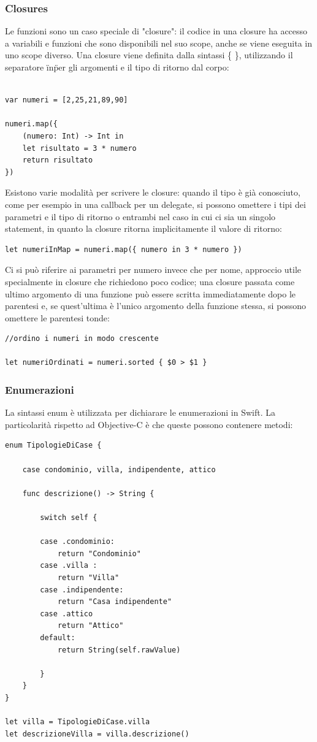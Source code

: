 \subsubsection{Closures}
Le funzioni sono un caso speciale di "closure": il codice in una closure ha accesso a variabili e funzioni che sono disponibili nel suo scope, anche se viene eseguita in uno scope diverso. Una closure viene definita dalla sintassi \{ \}, utilizzando il separatore \"in\" per gli argomenti e il tipo di ritorno dal corpo:\\\\ 
\lstset{language=[Objective]C, breakindent=40pt, breaklines}
\begin{lstlisting}
var numeri = [2,25,21,89,90]

numeri.map({
	(numero: Int) -> Int in 
	let risultato = 3 * numero 
	return risultato 
})
\end{lstlisting}
Esistono varie modalità per scrivere le closure: quando il tipo è già conosciuto, come per esempio in una callback per un delegate, si possono omettere i tipi dei parametri e il tipo di ritorno o entrambi nel caso in cui ci sia un singolo statement, in quanto la closure ritorna implicitamente il valore di ritorno:
\lstset{language=[Objective]C, breakindent=40pt, breaklines}
\begin{lstlisting}
let numeriInMap = numeri.map({ numero in 3 * numero })
\end{lstlisting}
Ci si può riferire ai parametri per numero invece che per nome, approccio utile specialmente in closure che richiedono poco codice; una closure passata come ultimo argomento di una funzione può essere scritta immediatamente dopo le parentesi e, se quest'ultima è l'unico argomento della funzione stessa, si possono omettere le parentesi tonde: 
\lstset{language=[Objective]C, breakindent=40pt, breaklines}
\begin{lstlisting}
//ordino i numeri in modo crescente

let numeriOrdinati = numeri.sorted { $0 > $1 }
\end{lstlisting}
\subsubsection{Enumerazioni}
La sintassi enum è utilizzata per dichiarare le enumerazioni in Swift. La particolarità rispetto ad Objective-C è che queste possono contenere metodi:
\lstset{language=[Objective]C, breakindent=40pt, breaklines}
\begin{lstlisting}
enum TipologieDiCase {

	case condominio, villa, indipendente, attico
	
	func descrizione() -> String {
	
		switch self {
	
		case .condominio:
			return "Condominio"
		case .villa :
			return "Villa"
		case .indipendente:
			return "Casa indipendente"
		case .attico
			return "Attico"
		default: 
			return String(self.rawValue)
		
		}
	}
}

let villa = TipologieDiCase.villa
let descrizioneVilla = villa.descrizione()
\end{lstlisting}
